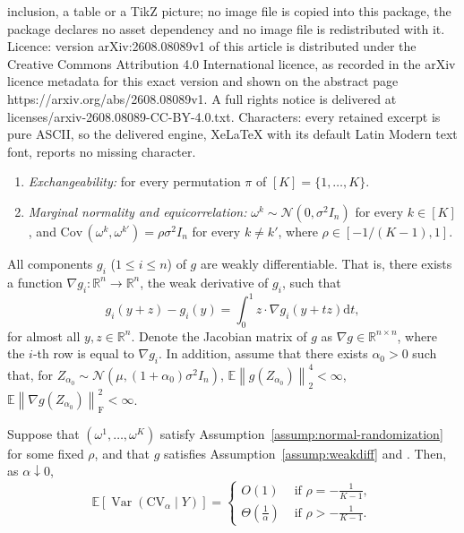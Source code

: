 \documentclass[10pt,a4paper]{amsart}
\DeclareMathOperator{\Var}{Var}
\def\Cov{{\textrm{Cov}}\,}
\def\calN{\mathcal{N}}
\newcommand{\EE}[2][]{\mathbb{E}_{#1}\left[#2\right]}
\newcommand{\cv}{{\mathrm{CV}}}
\newcommand{\eqd}{\stackrel{d}{=}}
\newcommand{\norm}[1]{\left\| #1 \right\|}
\begin{document}
inclusion, a table or a TikZ picture; no image file is copied into this package, the package declares no asset dependency and no image file is redistributed with it. Licence: version arXiv:2608.08089v1 of this article is distributed under the Creative Commons Attribution 4.0 International licence, as recorded in the arXiv licence metadata for this exact version and shown on the abstract page https://arxiv.org/abs/2608.08089v1. A full rights notice is delivered at licenses/arxiv-2608.08089-CC-BY-4.0.txt. Characters: every retained excerpt is pure ASCII, so the delivered engine, XeLaTeX with its default Latin Modern text font, reports no missing character.
\begin{assumption}
\label{assump:normal-randomization}
  \begin{enumerate}
    \item[(i)]\label{assump:exch} \emph{Exchangeability:} \sloppy{$(\omega^{\pi(1)}, \ldots, \omega^{\pi(K)}) \eqd (\omega^1, \ldots, \omega^K)$} for every permutation $\pi$ of $[K]=\{1,\ldots,K\}$.
    \item[(ii)]\label{assump:marg} \emph{Marginal normality and equicorrelation:} $\omega^k\sim\calN(0,\sigma^2 I_n)$ for every $k\in[K]$, and $\Cov(\omega^k,\omega^{k'}) = \rho\sigma^2 I_n$ for every $k\neq k'$, where $\rho\in[-1/(K-1),1]$.
  \end{enumerate}
\end{assumption}

\begin{assumption}
\label{assump:weakdiff}
    All components $g_i$ ($1 \le i \le n$) of $g$ are weakly differentiable. That is, there exists a function $\nabla g_i : \mathbb{R}^n \to \mathbb{R}^n$, the weak derivative of $g_i$, such that
    $$
g_i(y + z) - g_i(y) = \int_{0}^{1} z \cdot \nabla g_i(y + tz)\mathrm{d}t,
$$
for almost all $y, z \in \mathbb{R}^n$. Denote the Jacobian matrix of $g$ as $\nabla g \in \mathbb{R}^{n \times n}$, where the $i$-th row is equal to $\nabla g_i$.
In addition, assume that there exists $\alpha_0>0$ such that, for
$Z_{\alpha_0}\sim\calN(\mu,(1+\alpha_0)\sigma^2I_n)$,
$\mathbb{E}\norm{g(Z_{\alpha_0})}_2^4 < \infty$,
$\mathbb{E}\norm{\nabla g(Z_{\alpha_0})}_{\mathrm{F}}^2 < \infty$.

\end{assumption}

\begin{theorem}
\label{thm:alpha to 0}
Suppose that $(\omega^1,\ldots,\omega^K)$ satisfy Assumption~\ref{assump:normal-randomization} for some fixed $\rho$, and that $g$ satisfies Assumption~\ref{assump:weakdiff} and \sloppy{$\EE{\|g(Y)-Y\|^2_2}>0$}.
Then, as $\alpha\downarrow 0$,
\[
\mathbb{E} \left[\Var \!\left(\cv_{\alpha} \mid Y\right)\right] =\begin{cases}
O(1) &\text{ if } \rho=-\frac{1}{K-1},\\
\Theta(\frac{1}{\alpha}) &\text{ if } \rho>-\frac{1}{K-1}.
\end{cases}
\]
\end{theorem}
\end{document}
